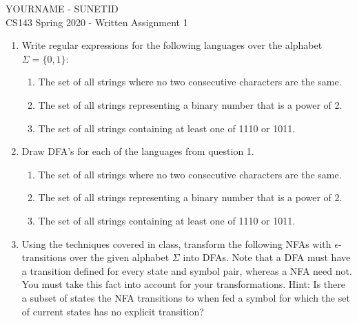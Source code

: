 \documentclass[11pt]{article}
\begin{document}
\begin{center}
\LARGE YOURNAME - SUNETID \\
\Large CS143 Spring 2020 - Written Assignment 1
\end{center}


\begin{enumerate}
  \item Write regular expressions for the following languages over the alphabet $\Sigma = \{0, 1\}$:
  \begin{enumerate}
    \item The set of all strings where no two consecutive characters are the same.
    \[
    \]
    \item The set of all strings representing a binary number that is a power of 2.
    \[
    \]
    \item The set of all strings containing at least one of 1110 or 1011.
    \[
    \]
  \end{enumerate}

  
  \newpage
  
  \item Draw DFA's for each of the languages from question 1.
  \begin{enumerate}
    \item The set of all strings where no two consecutive characters are the same.
    \[
    \]
    \item The set of all strings representing a binary number that is a power of 2.
    \[
    \]
    \item The set of all strings containing at least one of 1110 or 1011.
    \[
    \]
  \end{enumerate}
  
  \newpage
  
  \item Using the techniques covered in class, transform the following NFAs with $\epsilon$-transitions over the given alphabet $\Sigma$ into DFAs. Note that a DFA must have a transition defined for every state and symbol pair, whereas a NFA need not. You must take this fact into account for your transformations. Hint: Is there a subset of states the NFA transitions to when fed a symbol for which the set of current states has no explicit transition?
  

\end{enumerate}
\end{document}
